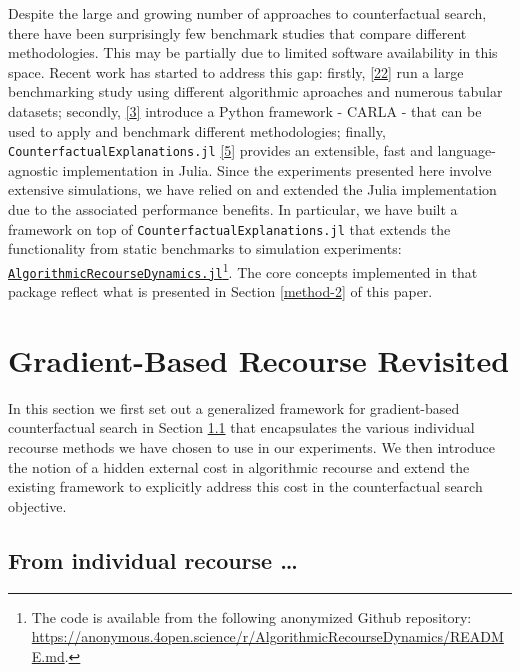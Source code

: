 \documentclass[conference,final,]{IEEEtran}
\begin{document}
Despite the large and growing number of approaches to counterfactual search, there have been surprisingly few benchmark studies that compare different methodologies. This may be partially due to limited software availability in this space. Recent work has started to address this gap: firstly, \protect\hyperlink{ref-de2021framework}{{[}22{]}} run a large benchmarking study using different algorithmic aproaches and numerous tabular datasets; secondly, \protect\hyperlink{ref-pawelczyk2021carla}{{[}3{]}} introduce a Python framework - CARLA - that can be used to apply and benchmark different methodologies; finally, \texttt{CounterfactualExplanations.jl} \protect\hyperlink{ref-altmeyer2022CounterfactualExplanations}{{[}5{]}} provides an extensible, fast and language-agnostic implementation in Julia. Since the experiments presented here involve extensive simulations, we have relied on and extended the Julia implementation due to the associated performance benefits. In particular, we have built a framework on top of \texttt{CounterfactualExplanations.jl} that extends the functionality from static benchmarks to simulation experiments: \href{(https://anonymous.4open.science/r/AlgorithmicRecourseDynamics/README.md)}{\texttt{AlgorithmicRecourseDynamics.jl}}\footnote{The code is available from the following anonymized Github repository: \url{https://anonymous.4open.science/r/AlgorithmicRecourseDynamics/README.md}.}. The core concepts implemented in that package reflect what is presented in Section \ref{method-2} of this paper.

\hypertarget{method}{%
\section{Gradient-Based Recourse Revisited}\label{method}}

In this section we first set out a generalized framework for gradient-based counterfactual search in Section \ref{method-general} that encapsulates the various individual recourse methods we have chosen to use in our experiments. We then introduce the notion of a hidden external cost in algorithmic recourse and extend the existing framework to explicitly address this cost in the counterfactual search objective.

\hypertarget{method-general}{%
\subsection{From individual recourse \ldots{}}\label{method-general}}
\end{document}
